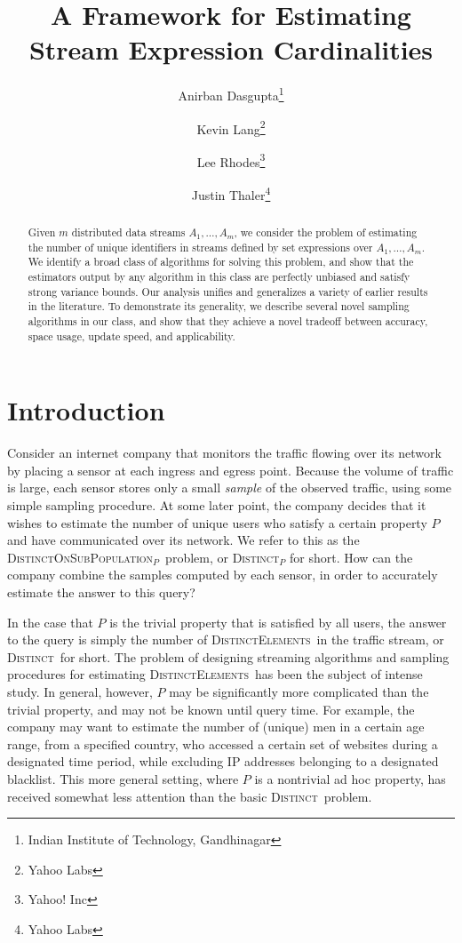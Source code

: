 \documentclass{article}
\title{A Framework for Estimating Stream Expression Cardinalities}
\author{Anirban Dasgupta\thanks{Indian Institute of Technology, Gandhinagar} \and Kevin Lang\thanks{Yahoo Labs} \and Lee Rhodes\thanks{Yahoo! Inc} \and Justin Thaler\thanks{Yahoo Labs}}
\date{}
\newcommand{\distinctsubP}{\textsc{DistinctOnSubPopulation}$_P$}
\newcommand{\distinct}{\textsc{Distinct}}
\newcommand{\DistinctElements}{\textsc{DistinctElements}}
\begin{document}
\maketitle

\begin{abstract}
Given $m$ distributed data streams $A_1, \dots, A_m$, we consider the problem 
of estimating the number of unique identifiers in streams defined by set expressions over $A_1, \dots, A_m$.
We identify a broad class of algorithms for solving this problem, and show that the estimators output by any algorithm in this class 
are perfectly unbiased and satisfy strong variance bounds. Our analysis unifies and generalizes a variety of earlier results in the literature. 
To demonstrate its generality, we describe several novel sampling algorithms in our class, and show that they
achieve a novel tradeoff between accuracy, space usage, update speed, and applicability. \end{abstract}

\section{Introduction} 
Consider an internet company that monitors the traffic flowing over its network by placing 
a sensor at each ingress and egress point. Because the volume of traffic is large,
each sensor stores only a small \emph{sample} of the observed traffic, using some simple sampling procedure. 
At some later point, the company
decides that it wishes to estimate the number of unique users who satisfy a certain property $P$ and have communicated over its network.
We refer to this as the \distinctsubP\ problem, or \distinct$_P$ for short.
How can the company combine the samples computed by each sensor, in order to accurately estimate the answer to this query?
 
In the case that $P$ is the trivial property that is satisfied by all users, the answer to the query is simply the 
number of \DistinctElements\ in the traffic stream, or \distinct\ for short. The problem of designing streaming algorithms and sampling procedures
for estimating \DistinctElements\ has been the subject of intense study. In general, however, $P$ may be significantly more complicated than the trivial property, and may not be known until query time. 
For example, the company may want to estimate the number of (unique) men in a certain age range,
 from a specified country, who accessed a certain set of websites during a designated time period, while excluding IP addresses belonging to a 
 designated blacklist.  
This more general setting, where $P$ is a nontrivial ad hoc property, has received somewhat less attention than the basic \distinct\ problem.
\end{document}
